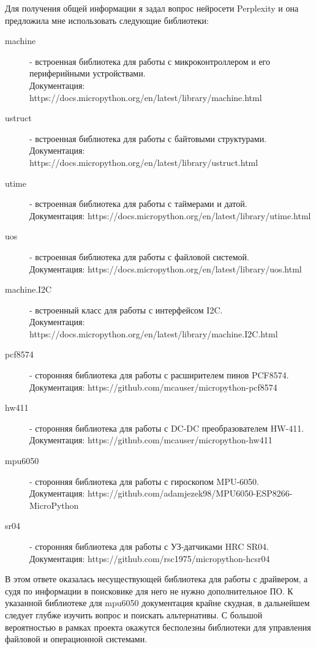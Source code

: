 Для получения общей информации я задал вопрос нейросети Perplexity и она предложила мне использовать следующие библиотеки:
\begin{description}
    \item[machine] - встроенная библиотека для работы с микроконтроллером и его периферийными устройствами.\\
    Документация: https://docs.micropython.org/en/latest/library/machine.html
    \item[ustruct] - встроенная библиотека для работы с байтовыми структурами.\\
    Документация: https://docs.micropython.org/en/latest/library/ustruct.html
    \item[utime] - встроенная библиотека для работы с таймерами и датой.\\
    Документация: https://docs.micropython.org/en/latest/library/utime.html
    \item[uos] - встроенная библиотека для работы с файловой системой.\\
    Документация: https://docs.micropython.org/en/latest/library/uos.html
    \item[machine.I2C] - встроенный класс для работы с интерфейсом I2C.\\
    Документация: https://docs.micropython.org/en/latest/library/machine.I2C.html
    \item[pcf8574] - сторонняя библиотека для работы с расширителем пинов PCF8574.\\
    Документация: https://github.com/mcauser/micropython-pcf8574
    \item[hw411] - сторонняя библиотека для работы с DC-DC преобразователем HW-411.\\
    Документация: https://github.com/mcauser/micropython-hw411
    \item[mpu6050] - сторонняя библиотека для работы с гироскопом MPU-6050.\\
    Документация: https://github.com/adamjezek98/MPU6050-ESP8266-MicroPython
    \item[sr04] - сторонняя библиотека для работы с УЗ-датчиками HRC SR04.\\
    Документация: https://github.com/rsc1975/micropython-hcsr04
\end{description}

В этом ответе оказалась несуществующей библиотека для работы с драйвером, а судя по информации в поисковике для него не нужно дополнительное ПО. К указанной библиотеке для mpu6050 документация крайне скудная, в дальнейшем следует глубже изучить вопрос и поискать альтернативы. С большой вероятностью в рамках проекта окажутся бесполезны библиотеки для управления файловой и операционной системами.

